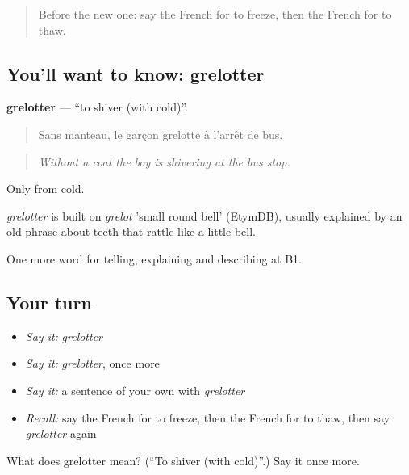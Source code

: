 \begin{quote}
Before the new one: say the French for to freeze, then the French for to thaw.
\end{quote}

\subsection*{You'll want to know: grelotter}
\textbf{grelotter} — \textquotedblleft{}to shiver (with cold)\textquotedblright{}.

\begin{quote}
Sans manteau, le garçon grelotte à l'arrêt de bus.
\end{quote}

\begin{quote}
\emph{Without a coat the boy is shivering at the bus stop.}
\end{quote}

Only from cold.

\begin{cousinweb}
\emph{grelotter} is built on \emph{grelot} 'small round bell' (EtymDB), usually explained by an old phrase about teeth that rattle like a little bell.
\end{cousinweb}

\begin{grammarlens}[title={What you've built}]
One more word for telling, explaining and describing at B1.
\end{grammarlens}

\subsection*{Your turn}
\begin{itemize}
\raggedright
  \item \emph{Say it:} \emph{grelotter}
  \item \emph{Say it:} \emph{grelotter}, once more
  \item \emph{Say it:} a sentence of your own with \emph{grelotter}
  \item \emph{Recall:} say the French for to freeze, then the French for to thaw, then say \emph{grelotter} again
\end{itemize}

\begin{tcolorbox}[breakable,colback=teal!4,colframe=teal!35!black,title={Before you move on}]
What does grelotter mean? (\textquotedblleft{}To shiver (with cold)\textquotedblright{}.) Say it once more.
\end{tcolorbox}
